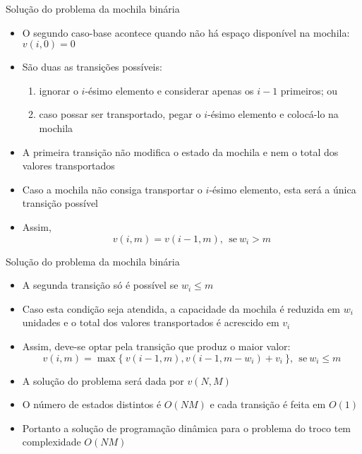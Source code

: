 \begin{frame}[fragile]{Solução do problema da mochila binária}

    \begin{itemize}
        \item O segundo caso-base acontece quando não há espaço disponível na mochila:
            $v(i, 0) = 0$

        \item São duas as transições possíveis:
        \begin{enumerate}
            \item ignorar o $i$-ésimo elemento e considerar apenas os $i - 1$ primeiros; ou
            \item caso possar ser transportado, pegar o $i$-ésimo elemento e colocá-lo na
                mochila
        \end{enumerate}

        \item A primeira transição não modifica o estado da mochila e nem o total dos valores
            transportados

        \item Caso a mochila não consiga transportar o $i$-ésimo elemento, esta será a única
        transição possível

        \item Assim,
        \[
            v(i, m) = v(i - 1, m), \ \ \mbox{se}\ w_i > m
        \]

    \end{itemize}

\end{frame}

\begin{frame}[fragile]{Solução do problema da mochila binária}

    \begin{itemize}
        \item A segunda transição só é possível se $w_i \leq m$

        \item Caso esta condição seja atendida, a capacidade da mochila é reduzida em $w_i$
            unidades e o total dos valores transportados é acrescido em $v_i$

        \item Assim, deve-se optar pela transição que produz o maior valor:
        \[
            v(i, m) = \max\{\ v(i -1, m), v(i - 1, m - w_i) + v_i\ \}, \ \ \mbox{se}\ w_i \leq m
        \]

        \item A solução do problema será dada por $v(N, M)$

        \item O número de estados distintos é $O(NM)$ e cada transição é feita em $O(1)$

        \item Portanto a solução de programação dinâmica para o problema do troco tem
            complexidade $O(NM)$
    \end{itemize}

\end{frame}


